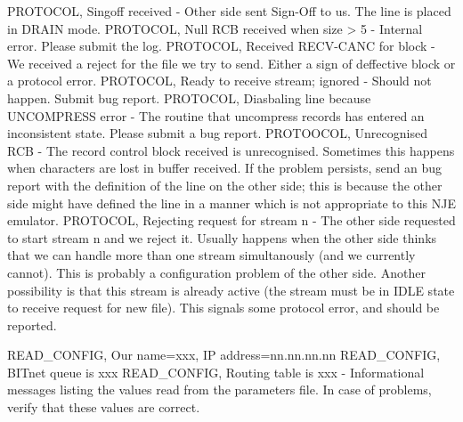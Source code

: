 \hfill\break
{\ncrBold PROTOCOL, Singoff received }
- Other side sent Sign-Off to us. The line is
placed in DRAIN mode.
\hfill\break
{\ncrBold PROTOCOL,  Null  RCB  received  when  size  > 5 }
- Internal error. Please
submit the log.
\hfill\break
{\ncrBold PROTOCOL, Received RECV-CANC for block }
- We received a  reject  for  the
file  we  try  to  send. Either a sign of deffective block or a protocol
error.
\hfill\break
{\ncrBold PROTOCOL, Ready to receive stream; ignored }
- Should not  happen.  Submit
bug report.
\hfill\break
{\ncrBold PROTOCOL,  Diasbaling  line  because UNCOMPRESS error}
- The routine that
uncompress records has entered an inconsistent state.  Please  submit  a
bug report.
\hfill\break
{\ncrBold PROTOOCOL,  Unrecognised  RCB }
-  The  record  control block received is
unrecognised. Sometimes this happens when characters are lost in  buffer
received.  If  the  problem  persists,  send  an  bug  report  with  the
definition of the line on the other side; this is because the other side
might have defined the line in a manner which is not appropriate to this
NJE emulator.
\hfill\break
{\ncrBold PROTOCOL, Rejecting request for stream n}
- The other side  requested  to
start  stream  n  and  we reject it. Usually happens when the other side
thinks that we can handle more than one  stream  simultanously  (and  we
currently cannot). This is probably a configuration problem of the other
side. Another possibility is that this stream  is  already  active  (the
stream  must  be  in  IDLE  state to receive request for new file). This
signals some protocol error, and should be reported.

\hfill\break
{\ncrBold READ\_CONFIG, Our name=xxx, IP address=nn.nn.nn.nn}
\hfill\break
{\ncrBold READ\_CONFIG, BITnet queue is xxx}
\hfill\break
{\ncrBold READ\_CONFIG, Routing table is xxx}
- Informational messages  listing  the
values  read  from the parameters file. In case of problems, verify that
these values are correct.

